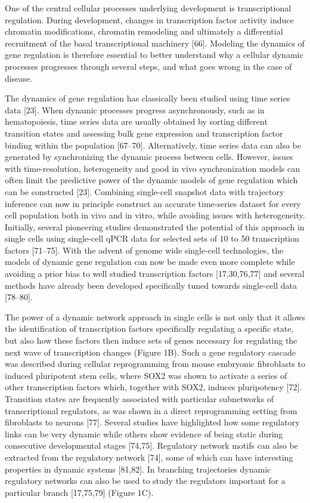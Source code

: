 

One of the central cellular processes underlying development is transcriptional regulation. During development, changes in transcription factor activity induce chromatin modifications, chromatin remodeling and ultimately a differential recruitment of the basal transcriptional machinery [66]. Modeling the dynamics of gene regulation is therefore essential to better understand why a cellular dynamic processes progresses through several steps, and what goes wrong in the case of disease.

The dynamics of gene regulation has classically been studied using time series data [23]. When dynamic processes progress asynchronously, such as in hematopoiesis, time series data are usually obtained by sorting different transition states and assessing bulk gene expression and transcription factor binding within the population [67–70]. Alternatively, time series data can also be generated by synchronizing the dynamic process between cells. However, issues with time-resolution, heterogeneity and good in vivo synchronization models can often limit the predictive power of the dynamic models of gene regulation which can be constructed [23]. Combining single-cell snapshot data with trajectory inference can now in principle construct an accurate time-series dataset for every cell population both in vivo and in vitro, while avoiding issues with heterogeneity. Initially, several pioneering studies demonstrated the potential of this approach in single cells using single-cell qPCR data for selected sets of 10 to 50 transcription factors [71–75]. With the advent of genome wide single-cell technologies, the models of dynamic gene regulation can now be made even more complete while avoiding a prior bias to well studied transcription factors [17,30,76,77] and several methods have already been developed specifically tuned towards single-cell data [78–80].

The power of a dynamic network approach in single cells is not only that it allows the identification of transcription factors specifically regulating a specific state, but also how these factors then induce sets of genes necessary for regulating the next wave of transcription changes (Figure 1B). Such a gene regulatory cascade was described during cellular reprogramming from mouse embryonic fibroblasts to induced pluripotent stem cells, where SOX2 was shown to activate a series of other transcription factors which, together with SOX2, induces pluripotency [72]. Transition states are frequently associated with particular subnetworks of transcriptional regulators, as was shown in a direct reprogramming setting from fibroblasts to neurons [77]. Several studies have highlighted how some regulatory links can be very dynamic while others show evidence of being static during consecutive developmental stages [74,75]. Regulatory network motifs can also be extracted from the regulatory network [74], some of which can have interesting properties in dynamic systems [81,82]. In branching trajectories dynamic regulatory networks can also be used to study the regulators important for a particular branch [17,75,79] (Figure 1C).


